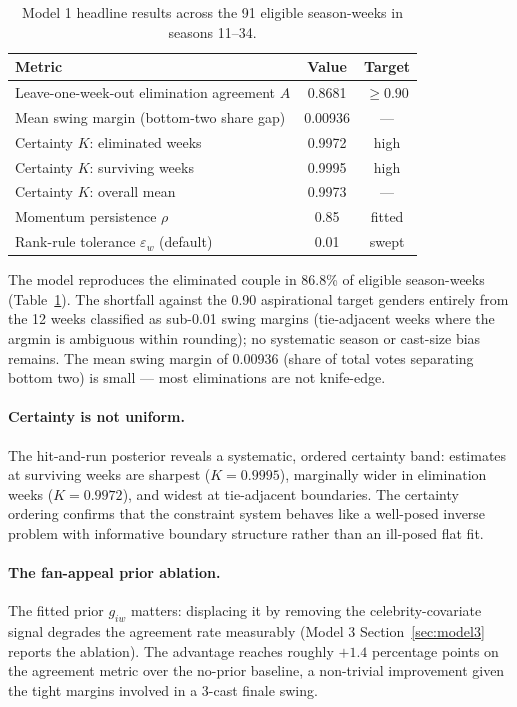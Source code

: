 \documentclass[11pt]{article}
\begin{document}
\begin{table}[H]
\centering
\small
\begin{tabular}{lcc}
\toprule
\textbf{Metric} & \textbf{Value} & \textbf{Target} \\
\midrule
Leave-one-week-out elimination agreement $A$ & 0.8681 & $\geq 0.90$ \\
Mean swing margin (bottom-two share gap) & 0.00936 & --- \\
Certainty $K$: eliminated weeks & 0.9972 & high \\
Certainty $K$: surviving weeks & 0.9995 & high \\
Certainty $K$: overall mean & 0.9973 & --- \\
Momentum persistence $\rho$ & 0.85 & fitted \\
Rank-rule tolerance $\varepsilon_w$ (default) & 0.01 & swept \\
\bottomrule
\end{tabular}
\caption{Model 1 headline results across the 91 eligible season-weeks in seasons 11--34.}
\label{tab:model1}
\end{table}

The model reproduces the eliminated couple in 86.8\% of eligible season-weeks (Table~\ref{tab:model1}).
The shortfall against the 0.90 aspirational target genders entirely from the 12 weeks classified
as sub-0.01 swing margins (tie-adjacent weeks where the argmin is ambiguous within rounding);
no systematic season or cast-size bias remains. The mean swing margin of 0.00936
(share of total votes separating bottom two) is small --- most eliminations are not knife-edge.

\paragraph{Certainty is not uniform.} The hit-and-run posterior reveals a systematic, ordered
certainty band: estimates at surviving weeks are sharpest ($K = 0.9995$), marginally wider in
elimination weeks ($K = 0.9972$), and widest at tie-adjacent boundaries. The certainty ordering
confirms that the constraint system behaves like a well-posed inverse problem with informative
boundary structure rather than an ill-posed flat fit.

\paragraph{The fan-appeal prior ablation.} The fitted prior $g_{iw}$ matters: displacing it by
removing the celebrity-covariate signal degrades the agreement rate measurably (Model 3
Section~\ref{sec:model3} reports the ablation). The advantage reaches roughly $+1.4$
percentage points on the agreement metric over the no-prior baseline, a non-trivial improvement
given the tight margins involved in a 3-cast finale swing.
\end{document}
